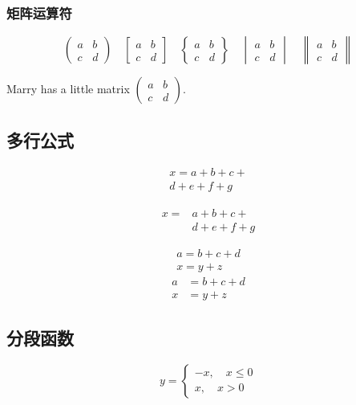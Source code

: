 \documentclass[12pt]{article}
\begin{document}
\subsubsection{矩阵运算符}
\[ 
\begin{pmatrix} 
	a&b\\c&d 
\end{pmatrix} \quad
\begin{bmatrix} 
	a&b\\c&d \end{bmatrix} \quad
\begin{Bmatrix} 
	a&b\\c&d \end{Bmatrix} \quad
\begin{vmatrix} 
	a&b\\c&d \end{vmatrix} \quad
\begin{Vmatrix} 
	a&b\\c&d \end{Vmatrix} 
\]

Marry has a little matrix $ ( \begin{smallmatrix} a&b\\c&d \end{smallmatrix} ) $.

\subsection{多行公式}
\begin{multline*}
x = a+b+c+{}\\
d+e+f+g
\end{multline*}

\[
\begin{aligned}
x={}&a+b+c+{}\\
&d+e+f+g
\end{aligned}
\]

\begin{gather}
a=b+c+d\\
x=y+z
\end{gather}
\begin{align}
a &= b+c+d\\
x &= y+z
\end{align}

\subsection{分段函数}
\[
y=\begin{cases}
-x, \quad x\leq 0\\
x, \quad x>0
\end{cases}
\]
\end{document}
